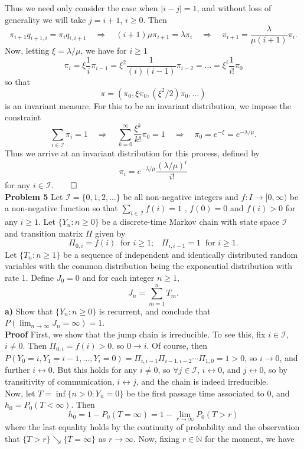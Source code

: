 \documentclass[11pt, letterpaper]{article}
\newcommand{\mbb}[1]{\mathbb{#1}}
\newcommand{\mc}[1]{\mathcal{#1}}
\begin{document}
    Thus we need only consider the case when $|i-j|=1$, and without loss of generality we will take $j=i+1$, $i\geq 0$. Then
    \[\pi_{i+1}q_{i+1,i}=\pi_iq_{i,i+1}\quad\Rightarrow\quad (i+1)\mu\pi_{i+1}=\lambda \pi_i\quad\Rightarrow\quad\pi_{i+1}=\frac{\lambda}{\mu(i+1)}\pi_i.\]
    Now, letting $\xi=\lambda/\mu$, we have for $i\geq 1$
    \[\pi_i=\xi\frac{1}{i}\pi_{i-1}=\xi^2\frac{1}{(i)(i-1)}\pi_{i-2}=\dots=\xi^i\frac{1}{i!}\pi_0\]
    so that
    \[\pi=(\pi_0,\xi\pi_0,(\xi^2/2)\pi_0,\dots)\]
    is an invariant measure. For this to be an invariant distribution, we impose the constraint
    \[\sum_{i\in\mc{I}}\pi_i=1\quad\Rightarrow\quad\sum_{k=0}^\infty\frac{\xi^k}{k!}\pi_0=1\quad\Rightarrow\quad\pi_0=e^{-\xi}=e^{-\lambda/\mu}.\]
    Thus we arrive at an invariant distribution for this process, defined by
    \[\pi_i=e^{-\lambda/\mu}\frac{(\lambda/\mu)^i}{i!}\]
    for any $i\in\mc{I}$.\hfill{$\qed$}\\[10pt]
    {\bf Problem 5} Let $\mc{I}=\{0,1,2,\dots\}$ be all non-negative integers and $f:I\rightarrow[0,\infty)$ be a non-negative function so that $\sum_{i\in\mc{I}}f(i)=1$
    , $f(0)=0$ and $f(i)>0$ for any $i\geq 1$. Let $\{Y_n:n\geq 0\}$ be a discrete-time Markov chain with state space $\mc{I}$ and transition matrix $\Pi$ given by
    \[\Pi_{0,i}=f(i)\;\;\text{for $i\geq 1$;}\quad\Pi_{i,i-1}=1\;\;\text{for $i\geq 1$.}\]
    Let $\{T_n:n\geq 1\}$ be a sequence of independent and identically distributed random variables with the common distribution being the exponential distribution with rate 1.
    Define $J_0=0$ and for each integer $n\geq 1$,
    \[J_n=\sum_{m=1}^nT_m.\]
    {\bf a)} Show that $\{Y_n:n\geq 0\}$ is recurrent, and conclude that $P(\lim_{n\rightarrow\infty}J_n=\infty)=1$.\\[10pt]
    {\bf Proof} First, we show that the jump chain is irreducible. To see this, fix $i\in\mc{I}$, $i\neq 0$. Then $\Pi_{0,i}=f(i)>0$, so $0\longrightarrow i$.
    Of course, then $P(Y_0=i,Y_1=i-1,\dots,Y_i=0)=\Pi_{i,i-1}\Pi_{i-1,i-2}\cdots\Pi_{1,0}=1>0$, so $i\longrightarrow 0$, and further $i\longleftrightarrow 0$.
    But this holds for any $i\neq 0$, so $\forall j\in\mc{I}$, $i\longleftrightarrow 0$, and $j\longleftrightarrow 0$, so by transitivity of communication, $i\longleftrightarrow j$,
    and the chain is indeed irreducible.\\[10pt]
    Now, let $T=\inf\{n>0:Y_n=0\}$ be the first passage time associated to $0$, and $h_0=P_0(T<\infty)$. Then
    \[h_0=1-P_0(T=\infty)=1-\lim_{r\rightarrow\infty}P_0(T>r)\]
    where the last equality holds by the continuity of probability and the observation that $\{T>r\}\searrow\{T=\infty\}$ as $r\rightarrow\infty$. Now, fixing $r\in\mbb{N}$ for the moment, we have
\end{document}
